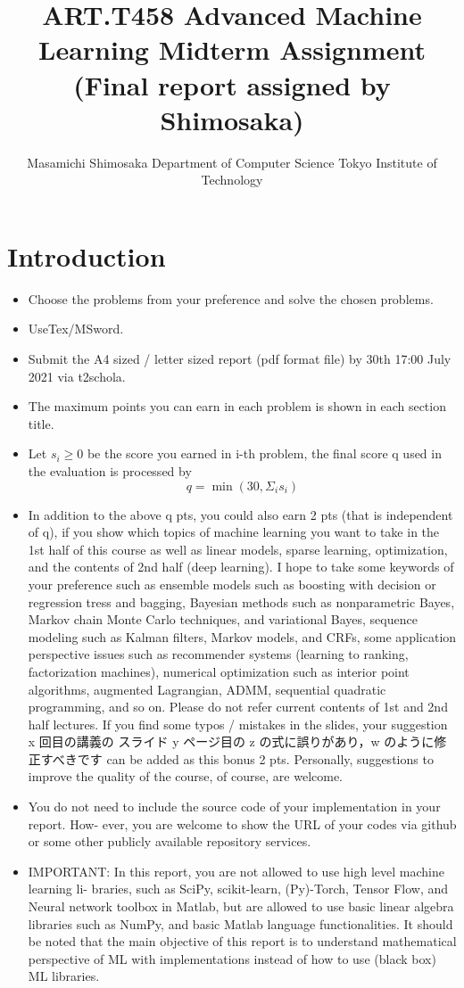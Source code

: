 \documentclass{jsarticle}
\title{ART.T458 Advanced Machine Learning Midterm Assignment
(Final report assigned by Shimosaka)}
\author{Masamichi Shimosaka
Department of Computer Science Tokyo Institute of Technology}
\begin{document}
\maketitle
\section*{Introduction}
\begin{itemize}
  \item Choose the problems from your preference and solve the chosen problems.
  \item UseTex/MSword.
  \item Submit the A4 sized / letter sized report (pdf format file) by 30th 17:00 July 2021 via t2schola.
  \item The maximum points you can earn in each problem is shown in each section title.
  \item Let $s_i \ge 0$ be the score you earned in i-th problem, the final score q used in the evaluation
is processed by
$$q = \min(30,\Sigma_i s_i)$$
  \item In addition to the above q pts, you could also earn 2 pts (that is independent of q), if you show which topics of machine learning you want to take in the 1st half of this course as well as linear models, sparse learning, optimization, and the contents of 2nd half (deep learning). I hope to take some keywords of your preference such as ensemble models such as boosting with decision or regression tress and bagging, Bayesian methods such as nonparametric Bayes, Markov chain Monte Carlo techniques, and variational Bayes, sequence modeling such as Kalman filters, Markov models, and CRFs, some application perspective issues such as recommender systems (learning to ranking, factorization machines), numerical optimization such as interior point algorithms, augmented Lagrangian, ADMM, sequential quadratic programming, and so on. Please do not refer current contents of 1st and 2nd half lectures. If you find some typos / mistakes in the slides, your suggestion x 回目の講義の スライド y ページ目の z の式に誤りがあり，w のように修正すべきです can be added as this bonus 2 pts. Personally, suggestions to improve the quality of the course, of course, are welcome.
  \item You do not need to include the source code of your implementation in your report. How- ever, you are welcome to show the URL of your codes via github or some other publicly available repository services.
  \item IMPORTANT: In this report, you are not allowed to use high level machine learning li- braries, such as SciPy, scikit-learn, (Py)-Torch, Tensor Flow, and Neural network toolbox in Matlab, but are allowed to use basic linear algebra libraries such as NumPy, and basic Matlab language functionalities. It should be noted that the main objective of this report is to understand mathematical perspective of ML with implementations instead of how to use (black box) ML libraries.

\end{itemize}
\end{document}
